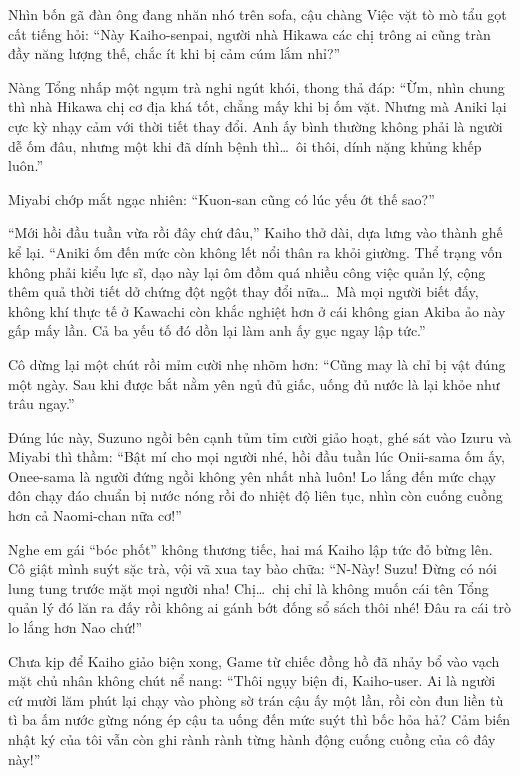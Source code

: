 \documentclass[../main.tex]{subfiles}
\begin{document}
Nhìn bốn gã đàn ông đang nhăn nhó trên sofa, cậu chàng Việc vặt tò mò tẩu gọt cất tiếng hỏi: ``Này Kaiho-senpai, người nhà Hikawa các chị trông ai cũng tràn đầy năng lượng thế, chắc ít khi bị cảm cúm lắm nhỉ?''

Nàng Tổng nhấp một ngụm trà nghi ngút khói, thong thả đáp: ``Ừm, nhìn chung thì nhà Hikawa chị cơ địa khá tốt, chẳng mấy khi bị ốm vặt. Nhưng mà Aniki lại cực kỳ nhạy cảm với thời tiết thay đổi. Anh ấy bình thường không phải là người dễ ốm đâu, nhưng một khi đã dính bệnh thì\dots\ ôi thôi, dính nặng khủng khếp luôn.''

Miyabi chớp mắt ngạc nhiên: ``Kuon-san cũng có lúc yếu ớt thế sao?''

``Mới hồi đầu tuần vừa rồi đây chứ đâu,'' Kaiho thở dài, dựa lưng vào thành ghế kể lại. ``Aniki ốm đến mức còn không lết nổi thân ra khỏi giường. Thể trạng vốn không phải kiểu lực sĩ, dạo này lại ôm đồm quá nhiều công việc quản lý, cộng thêm quả thời tiết dở chứng đột ngột thay đổi nữa\dots\ Mà mọi người biết đấy, không khí thực tế ở Kawachi còn khắc nghiệt hơn ở cái không gian Akiba ảo này gấp mấy lần. Cả ba yếu tố đó dồn lại làm anh ấy gục ngay lập tức.''

Cô dừng lại một chút rồi mỉm cười nhẹ nhõm hơn: ``Cũng may là chỉ bị vật đúng một ngày. Sau khi được bắt nằm yên ngủ đủ giấc, uống đủ nước là lại khỏe như trâu ngay.''

Đúng lúc này, Suzuno ngồi bên cạnh tủm tỉm cười giảo hoạt, ghé sát vào Izuru và Miyabi thì thầm: ``Bật mí cho mọi người nhé, hồi đầu tuần lúc Onii-sama ốm ấy, Onee-sama là người đứng ngồi không yên nhất nhà luôn! Lo lắng đến mức chạy đôn chạy đáo chuẩn bị nước nóng rồi đo nhiệt độ liên tục, nhìn còn cuống cuồng hơn cả Naomi-chan nữa cơ!''

Nghe em gái ``bóc phốt'' không thương tiếc, hai má Kaiho lập tức đỏ bừng lên. Cô giật mình suýt sặc trà, vội vã xua tay bào chữa: ``N-Này! Suzu! Đừng có nói lung tung trước mặt mọi người nha! Chị\dots\ chị chỉ là không muốn cái tên Tổng quản lý đó lăn ra đấy rồi không ai gánh bớt đống sổ sách thôi nhé! Đâu ra cái trò lo lắng hơn Nao chứ!''

Chưa kịp để Kaiho giảo biện xong, Game từ chiếc đồng hồ đã nhảy bổ vào vạch mặt chủ nhân không chút nể nang: ``Thôi ngụy biện đi, Kaiho-user. Ai là người cứ mười lăm phút lại chạy vào phòng sờ trán cậu ấy một lần, rồi còn đun liền tù tì ba ấm nước gừng nóng ép cậu ta uống đến mức suýt thì bốc hỏa hả? Cảm biến nhật ký của tôi vẫn còn ghi rành rành từng hành động cuống cuồng của cô đây này!''
\end{document}

